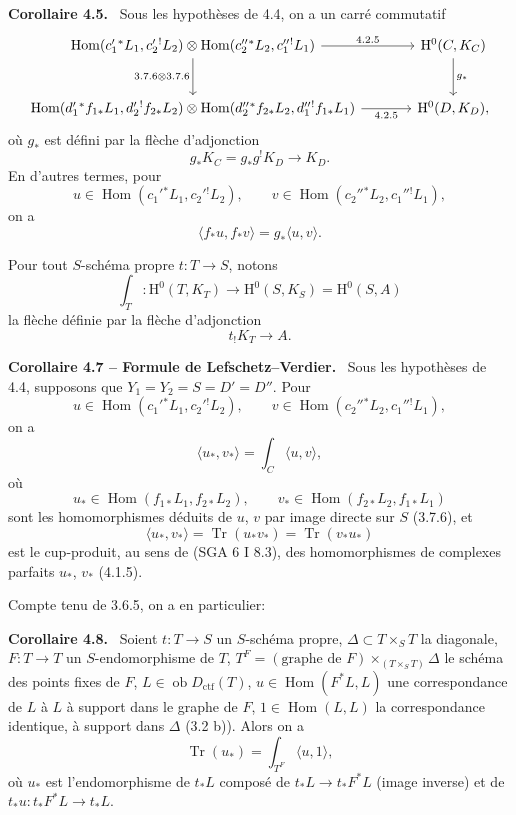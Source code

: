 \documentclass[11pt]{article}
\newenvironment{statement}[1]{\par\medskip\noindent\textbf{#1.}\ }{\par\medskip}
\renewcommand{\H}{\mathrm{H}}
\DeclareMathOperator{\Hom}{Hom}
\newcommand{\ob}{\operatorname{ob}}
\providecommand{\Dctf}{D_{\mathrm{ctf}}}
\providecommand{\Tr}{\operatorname{Tr}}
\providecommand{\Tr}{\operatorname{Tr}}
\providecommand{\Dctf}{D_{\mathrm{ctf}}}
\providecommand{\Tr}{\operatorname{Tr}}
\providecommand{\Hom}{\operatorname{Hom}}
\providecommand{\ob}{\operatorname{ob}}
\begin{document}
\begin{statement}{Corollaire 4.5}
Sous les hypothèses de 4.4, on a un carré commutatif
\[
\begin{tikzcd}[column sep=large,row sep=large]
\Hom(c_1'{}^*L_1,c_2'{}^!L_2)\otimes
\Hom(c_2''{}^*L_2,c_1''{}^!L_1)
 \arrow[r,"4.2.5"] \arrow[d,"3.7.6\otimes 3.7.6"'] &
\H^0(C,K_C)\arrow[d,"g_*"]\\
\Hom(d_1'{}^*f_{1*}L_1,d_2'{}^!f_{2*}L_2)\otimes
\Hom(d_2''{}^*f_{2*}L_2,d_1''{}^!f_{1*}L_1)
 \arrow[r,"4.2.5"'] &
\H^0(D,K_D),
\end{tikzcd}
\]
où $g_*$ est défini par la flèche d'adjonction
\[
g_*K_C=g_*g^!K_D\longrightarrow K_D.
\]
En d'autres termes, pour
\[
u\in\Hom(c_1'{}^*L_1,c_2'{}^!L_2),\qquad
v\in\Hom(c_2''{}^*L_2,c_1''{}^!L_1),
\]
on a
\begin{equation}
\tag{4.5.1}
\langle f_*u,f_*v\rangle=g_*\langle u,v\rangle.
\end{equation}
\end{statement}

Pour tout $S$-schéma propre $t:T\longrightarrow S$, notons
\begin{equation}
\tag{4.6}
\int_T:\H^0(T,K_T)\longrightarrow \H^0(S,K_S)=\H^0(S,A)
\end{equation}
la flèche définie par la flèche d'adjonction
\[
t_!K_T\longrightarrow A.
\]

\begin{statement}{Corollaire 4.7 -- Formule de Lefschetz--Verdier}
Sous les hypothèses de 4.4, supposons que $Y_1=Y_2=S=D'=D''$. Pour
\[
u\in\Hom(c_1'{}^*L_1,c_2'{}^!L_2),\qquad
v\in\Hom(c_2''{}^*L_2,c_1''{}^!L_1),
\]
on a
\begin{equation}
\tag{4.7.1}
\langle u_*,v_*\rangle=\int_C\langle u,v\rangle,
\end{equation}
où
\[
u_*\in\Hom(f_{1*}L_1,f_{2*}L_2),\qquad
v_*\in\Hom(f_{2*}L_2,f_{1*}L_1)
\]
sont les homomorphismes déduits de $u$, $v$ par image directe sur $S$ (3.7.6), et
\[
\langle u_*,v_*\rangle=\Tr(u_*v_*)=\Tr(v_*u_*)
\]
est le cup-produit, au sens de (SGA 6 I 8.3), des homomorphismes de complexes parfaits $u_*$, $v_*$ (4.1.5).
\end{statement}

Compte tenu de 3.6.5, on a en particulier:

\begin{statement}{Corollaire 4.8}
Soient $t:T\longrightarrow S$ un $S$-schéma propre, $\Delta\subset T\times_S T$ la diagonale, $F:T\longrightarrow T$ un $S$-endomorphisme de $T$, $T^F=(\text{graphe de }F)\times_{(T\times_S T)}\Delta$ le schéma des points fixes de $F$, $L\in\ob\Dctf(T)$, $u\in\Hom(F^*L,L)$ une correspondance de $L$ à $L$ à support dans le graphe de $F$, $1\in\Hom(L,L)$ la correspondance identique, à support dans $\Delta$ (3.2 b)). Alors on a
\[
\Tr(u_*)=\int_{T^F}\langle u,1\rangle,
\]
où $u_*$ est l'endomorphisme de $t_*L$ composé de $t_*L\longrightarrow t_*F^*L$ (image inverse) et de $t_*u:t_*F^*L\longrightarrow t_*L$.
\end{statement}
\end{document}
